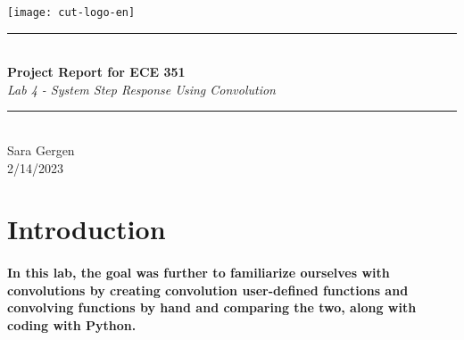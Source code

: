 \documentclass[12pt,a4paper]{article}
\newcommand{\HRule}{\rule{\linewidth}{0.5mm}}
\begin{document}
\begin{titlepage}
\begin{center}

\texttt{[image: cut-logo-en]}~\\[2cm]


\HRule \\[0.4cm]
{ \LARGE 
  \textbf{Project Report for ECE 351}\\[0.4cm]
  \emph{Lab 4 - System Step Response Using Convolution}\\[0.4cm]
}
\HRule \\[1.5cm]



{ \large
  Sara Gergen \\[0.1cm]
  2/14/2023\\[0.1cm]
}

\vfill



 
\end{center}
\end{titlepage}


\newpage



\tableofcontents
{}
\newpage
\setcounter{page}{1}

\section{Introduction}\label{sec:intro}

\paragraph{In this lab, the goal was further to familiarize ourselves with convolutions by creating convolution user-defined functions and convolving functions by hand and comparing the two, along with coding with Python.}
\end{document}
